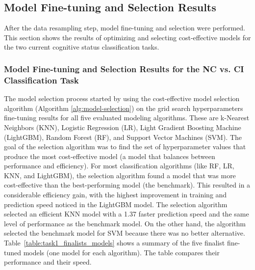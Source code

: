 \subsection{Model Fine-tuning and Selection Results}
After the data resampling step, model fine-tuning and selection were performed. This section shows the results of optimizing and selecting cost-effective models for the two current cognitive status classification tasks. 

\subsubsection{Model Fine-tuning and Selection Results for the NC vs. CI Classification Task} 
The model selection process started by using the cost-effective model selection algorithm (Algorithm \ref{alg:model-selection}) on the grid search hyperparameters fine-tuning results for all five evaluated modeling algorithms. These are k-Nearest Neighbors (\acrshort{KNN}), Logistic Regression (\acrshort{LR}), Light Gradient Boosting Machine (\acrshort{LightGBM}), Random Forest (RF), and Support Vector Machines (\acrshort{SVM}). The goal of the selection algorithm was to find the set of hyperparameter values that produce the most cost-effective model (a model that balances between performance and efficiency). For most classification algorithms (like RF, LR, KNN, and LightGBM), the selection algorithm found a model that was more cost-effective than the best-performing model (the benchmark). This resulted in a considerable efficiency gain, with the highest improvement in training and prediction speed noticed in the LightGBM model. The selection algorithm selected an efficient KNN model with a 1.37 faster prediction speed and the same level of performance as the benchmark model. On the other hand, the algorithm selected the benchmark model for SVM because there was no better alternative. Table~\ref{table:task1_finalists_models} shows a summary of the five finalist fine-tuned models (one model for each algorithm). The table compares their performance and their speed. 

